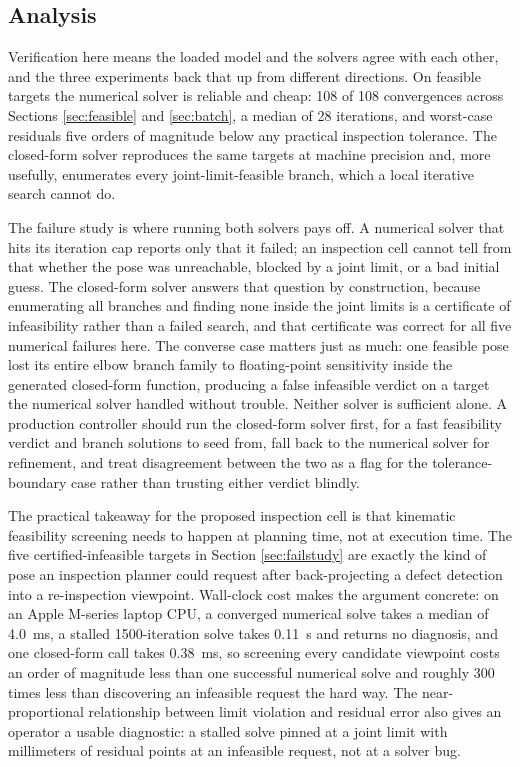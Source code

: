 \documentclass[conference]{IEEEtran}
\begin{document}
\subsection{Analysis}
Verification here means the loaded model and the solvers agree with each other, and the three experiments back that up from different directions. On feasible targets the numerical solver is reliable and cheap: 108 of 108 convergences across Sections \ref{sec:feasible} and \ref{sec:batch}, a median of 28 iterations, and worst-case residuals five orders of magnitude below any practical inspection tolerance. The closed-form solver reproduces the same targets at machine precision and, more usefully, enumerates every joint-limit-feasible branch, which a local iterative search cannot do.

The failure study is where running both solvers pays off. A numerical solver that hits its iteration cap reports only that it failed; an inspection cell cannot tell from that whether the pose was unreachable, blocked by a joint limit, or a bad initial guess. The closed-form solver answers that question by construction, because enumerating all branches and finding none inside the joint limits is a certificate of infeasibility rather than a failed search, and that certificate was correct for all five numerical failures here. The converse case matters just as much: one feasible pose lost its entire elbow branch family to floating-point sensitivity inside the generated closed-form function, producing a false infeasible verdict on a target the numerical solver handled without trouble. Neither solver is sufficient alone. A production controller should run the closed-form solver first, for a fast feasibility verdict and branch solutions to seed from, fall back to the numerical solver for refinement, and treat disagreement between the two as a flag for the tolerance-boundary case rather than trusting either verdict blindly.

The practical takeaway for the proposed inspection cell is that kinematic feasibility screening needs to happen at planning time, not at execution time. The five certified-infeasible targets in Section \ref{sec:failstudy} are exactly the kind of pose an inspection planner could request after back-projecting a defect detection into a re-inspection viewpoint. Wall-clock cost makes the argument concrete: on an Apple M-series laptop CPU, a converged numerical solve takes a median of 4.0~ms, a stalled 1500-iteration solve takes 0.11~s and returns no diagnosis, and one closed-form call takes 0.38~ms, so screening every candidate viewpoint costs an order of magnitude less than one successful numerical solve and roughly 300 times less than discovering an infeasible request the hard way. The near-proportional relationship between limit violation and residual error also gives an operator a usable diagnostic: a stalled solve pinned at a joint limit with millimeters of residual points at an infeasible request, not at a solver bug.
\end{document}
